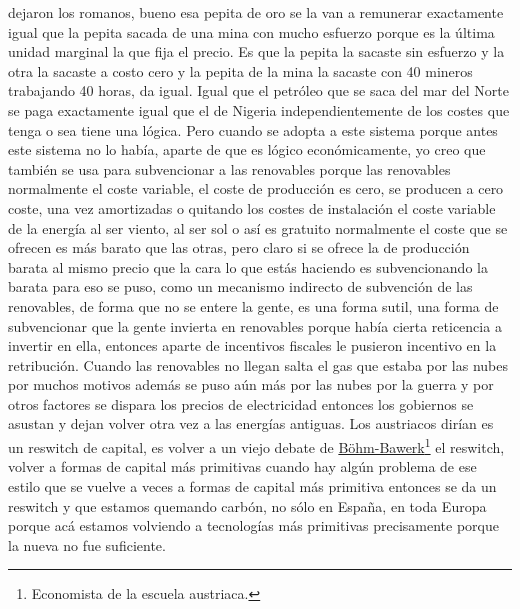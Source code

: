 dejaron los romanos, bueno esa pepita de oro se la van a remunerar exactamente igual que la pepita sacada de una mina con mucho esfuerzo porque es la última unidad marginal la que fija el precio. Es que la pepita la sacaste sin esfuerzo y la otra la sacaste a costo cero y la pepita de la mina la sacaste con 40 mineros trabajando 40 horas, da igual. Igual que el petróleo que se saca del mar del Norte se paga exactamente igual que el de Nigeria independientemente de los costes que tenga o sea tiene una lógica. Pero cuando se adopta a este sistema porque antes este sistema no lo había, aparte de que es lógico económicamente, yo creo que también se usa para subvencionar a las renovables porque las renovables normalmente el coste variable, el coste de producción es cero, se producen a cero coste, una vez amortizadas o quitando los costes de instalación el coste variable de la energía al ser viento, al ser sol o así es gratuito normalmente el coste que se ofrecen es más barato que las otras, pero claro si se ofrece la de producción barata al mismo precio que la cara lo que estás haciendo es subvencionando la barata para eso se puso, como un mecanismo indirecto de subvención de las renovables, de forma que no se entere la gente, es una forma sutil, una forma de subvencionar que la gente invierta en renovables porque había cierta reticencia a invertir en ella, entonces aparte de incentivos fiscales le pusieron incentivo en la retribución. Cuando las renovables no llegan salta el gas que estaba por las nubes por muchos motivos además se puso aún más por las nubes por la guerra y por otros factores se dispara los precios de electricidad entonces los gobiernos se asustan y dejan volver otra vez a las energías antiguas. Los austriacos dirían es un reswitch de capital, es volver a un viejo debate de \href{https://en.wikipedia.org/wiki/Eugen_von_B%C3%B6hm-Bawerk}{Böhm-Bawerk}\footnote{Economista de la escuela austriaca.} el reswitch, volver a formas de capital más primitivas cuando hay algún problema de ese estilo que se vuelve a veces a formas de capital más primitiva entonces se da un reswitch y que estamos quemando carbón, no sólo en España, en toda Europa porque acá estamos volviendo a tecnologías más primitivas precisamente porque la nueva no fue suficiente.

